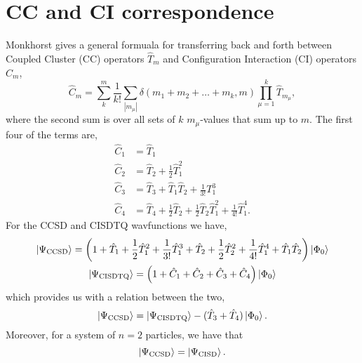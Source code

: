 \chapter{CC and CI correspondence}
\label{app:cc_vs_ci}

Monkhorst\cite{monkhorst1977calculation} gives a general formuala for transferring 
back and forth between Coupled Cluster (CC) operators $\hat{T}_m$ and
Configuration Interaction (CI) operators $\hat{C}_m$,
\begin{equation}
    \hat{C}_m = \sum_{k}^m\frac{1}{k!}\sum_{|m_\mu|}
        \delta(m_1 + m_2 + \dots + m_k, m) \prod_{\mu=1}^k\hat{T}_{m_\mu},
\end{equation}
where the second sum is over all sets of $k$ $m_\mu$-values that sum up to $m$.
The first four of the terms are,
\begin{align}
    \hat{C}_1 &= \hat{T}_1 \\
    \hat{C}_2 &= \hat{T}_2 + \frac{1}{2} \hat{T}_1^2 \\
    \hat{C}_3 &= \hat{T}_3 + \hat{T}_1\hat{T}_2 + \frac{1}{3!} T_1^3 \\
    \hat{C}_4 &= \hat{T}_4 + \frac{1}{2}\hat{T}_2
        + \frac{1}{2}\hat{T}_2\hat{T}_1^2 + \frac{1}{4!}\hat{T}_1^4.
\end{align}
For the CCSD and CISDTQ wavfunctions we have,
\begin{gather}
    \ket{\Psi_{\text{CCSD}}} = \left(
        1 + \hat{T}_1 + \frac{1}{2}\hat{T}_1^2 + \frac{1}{3!}\hat{T}_1^3 
        + \hat{T}_2 + \frac{1}{2}\hat{T}_2^2 + \frac{1}{4!}\hat{T}_1^4 
        + \hat{T}_1\hat{T}_2 
    \right) \ket{\Phi_0} \\
    \ket{\Psi_{\text{CISDTQ}}} = \left(
        1 + \hat{C}_1 + \hat{C}_2  + \hat{C}_3 + \hat{C}_4
    \right)\ket{\Phi_0}
\end{gather}
which provides us with a relation between the two,
\begin{equation}
    \ket{\Psi_{\text{CCSD}}} 
        = \ket{\Psi_{\text{CISDTQ}}} - (\hat{T}_3 + \hat{T}_4)\ket{\Phi_0}.
\end{equation}
Moreover, for a system of $n=2$ particles, we have that
\begin{equation}
    \ket{\Psi_{\text{CCSD}}} = \ket{\Psi_{\text{CISD}}}.
\end{equation}
